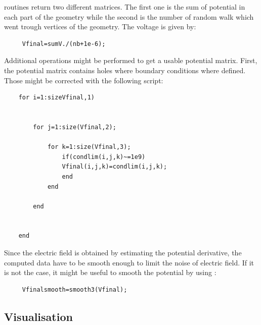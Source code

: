 \documentclass[10pt]{article}
\begin{document}
	 routines return two different matrices. The first one is the sum of potential in each part of the geometry while the second is the number of random walk which went trough vertices of the geometry.
	 The voltage is given by:
	 
	 \begin{lstlisting}
	 Vfinal=sumV./(nb+1e-6);
	 \end{lstlisting}
	 
	 Additional operations might be performed to get a usable potential matrix. First, the potential matrix contains holes where boundary conditions where defined. Those might be corrected with the following script:
	 
		\begin{lstlisting}
	for i=1:sizeVfinal,1)
	
	
		for j=1:size(Vfinal,2);
		
			for k=1:size(Vfinal,3);
				if(condlim(i,j,k)~=1e9)
				Vfinal(i,j,k)=condlim(i,j,k);
				end
			end
		
		end 
	
	
	end 
	 \end{lstlisting}
	 Since the electric field is obtained by estimating the potential derivative, the computed data have to be smooth enough to limit the noise of electric field. If it is not the case, it might be useful to smooth the potential by using :
	 
	 \begin{lstlisting}
	 Vfinalsmooth=smooth3(Vfinal);
	 \end{lstlisting}
	 

	
	 
	 
	 
	 
	\subsection{Visualisation}
	
\end{document}
